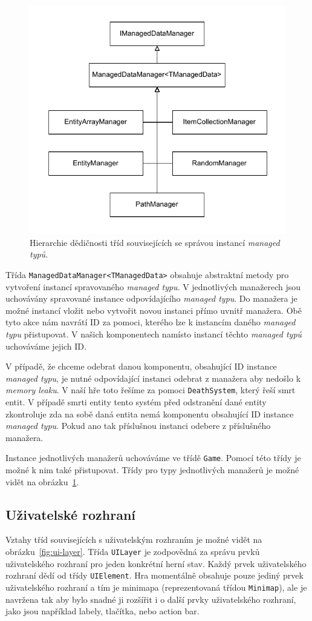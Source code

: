 \begin{figure}[!htb]
  \centering
  \includegraphics[width=0.6\linewidth]{img/managed_data_managers.pdf}
  \caption{Hierarchie dědičnosti tříd souvisejících se správou instancí \textit{managed typů}.}
  \label{fig:unmanaged-data-managers}
\end{figure}

Třída \texttt{ManagedDataManager<TManagedData>} obsahuje abstraktní metody pro vytvoření instancí spravovaného \textit{managed typu}. V jednotlivých manažerech jsou uchovávány spravované instance odpovídajícího \textit{managed typu}. Do manažera je možné instancí vložit nebo vytvořit novou instanci přímo uvnitř manažera. Obě tyto akce nám navrátí ID za pomoci, kterého lze k instancím daného \textit{managed typu} přistupovat. V našich komponentech namísto instancí těchto \textit{managed typů} uchováváme jejich ID.

V případě, že chceme odebrat danou komponentu, obsahující ID instance \textit{managed typu}, je nutné odpovídající instanci odebrat z manažera aby nedošlo k \textit{memory leaku}. V naší hře toto řešíme za pomoci \texttt{DeathSystem}, který řeší smrt entit. V případě smrti entity tento systém před odstranění dané entity zkontroluje zda na sobě daná entita nemá komponentu obsahující ID instance \textit{managed typu}. Pokud ano tak příslušnou instanci odebere z příslušného manažera.

Instance jednotlivých manažerů uchováváme ve třídě \texttt{Game}. Pomocí této třídy je možné k nim také přistupovat. Třídy pro typy jednotlivých manažerů je možné vidět na obrázku~\ref{fig:unmanaged-data-managers}.

\subsection{Uživatelské rozhraní}
Vztahy tříd souvisejících s uživatelským rozhraním je možné vidět na obrázku~\ref{fig:ui-layer}. Třída \texttt{UILayer} je zodpovědná za správu prvků uživatelského rozhraní pro jeden konkrétní herní stav. Každý prvek uživatelského rozhraní dědí od třídy \texttt{UIElement}. Hra momentálně obsahuje pouze jediný prvek uživatelského rozhraní a tím je minimapa (reprezentovaná třídou \texttt{Minimap}), ale je navržena tak aby bylo snadné ji rozšířit i o další prvky uživatelského rozhraní, jako jsou například labely, tlačítka, nebo action bar.

